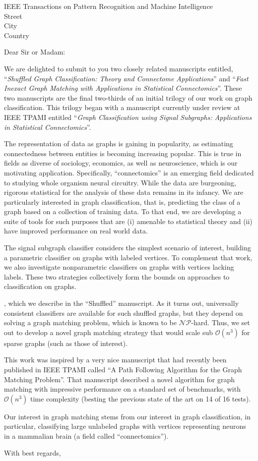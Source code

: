 \documentclass{letter}
\begin{document}
\begin{letter}{IEEE Transactions on Pattern Recognition and Machine Intelligence \\ Street\\ City\\ Country}
\opening{Dear Sir or Madam:}

We are delighted to submit to you two closely related manuscripts entitled, ``\emph{Shuffled Graph Classification: Theory and Connectome Applications}'' and ``\emph{Fast Inexact Graph Matching with Applications in Statistical Connectomics}''.  These two manuscripts are the final two-thirds of an initial trilogy of our work on graph classification.  This trilogy began with a manuscript currently under review at IEEE TPAMI entitled ``\emph{Graph Classification using Signal Subgraphs: Applications in Statistical Connectomics}''. 

The representation of data as graphs is gaining in popularity, as estimating connectedness between entities is becoming increasing popular.  This is true in fields as diverse of sociology, economics, as well as neuroscience, which is our motivating application.  Specifically, ``connectomics'' is an emerging field dedicated to studying whole organism neural circuitry.  While the data are burgeoning, rigorous statistical for the analysis of these data remains in its infancy. We are particularly interested in graph classification, that is, predicting the class of a graph based on a collection of training data.  To that end, we are developing a suite of tools for such purposes that are (i) amenable to statistical theory and (ii) have improved performance on real world data.


The signal subgraph classifier considers the simplest scenario of interest, building a parametric classifier on graphs with labeled vertices.  To complement that work, we also investigate nonparametric classifiers on graphs with vertices lacking labels. These two strategies collectively form the bounds on approaches to classification on graphs.  

, which we describe in the ``Shuffled'' manuscript. As it turns out, universally consistent classifiers are available for such shuffled graphs, but they depend on solving a graph matching problem, which is known to be $\mathcal{NP}$-hard. Thus, we set out to develop a novel graph matching strategy that would scale sub $\mathcal{O}(n^3)$ for sparse graphs (such as those of interest).


This work was inspired by a very nice manuscript that had recently been published in IEEE TPAMI called ``A Path Following Algorithm for the Graph Matching Problem''.  That manuscript described a novel algorithm for graph matching with impressive performance on a standard set of benchmarks, with $\mathcal{O}(n^3)$ time complexity (besting the previous state of the art on 14 of 16 tests).   

Our interest in graph matching stems from our interest in graph classification, in particular, classifying large unlabeled graphs with vertices representing neurons in a mammalian brain (a field called ``connectomics'').  

\closing{With best regards,}
\end{letter}
\end{document}
